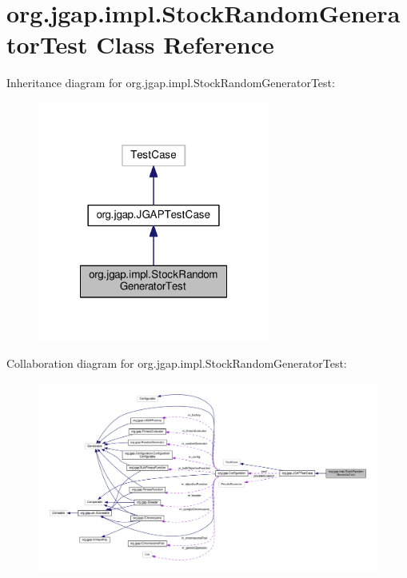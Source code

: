 \hypertarget{classorg_1_1jgap_1_1impl_1_1_stock_random_generator_test}{\section{org.\-jgap.\-impl.\-Stock\-Random\-Generator\-Test Class Reference}
\label{classorg_1_1jgap_1_1impl_1_1_stock_random_generator_test}
}


Inheritance diagram for org.\-jgap.\-impl.\-Stock\-Random\-Generator\-Test\-:
\nopagebreak
\begin{figure}[H]
\begin{center}
\leavevmode
\includegraphics[width=216pt]{classorg_1_1jgap_1_1impl_1_1_stock_random_generator_test__inherit__graph}
\end{center}
\end{figure}


Collaboration diagram for org.\-jgap.\-impl.\-Stock\-Random\-Generator\-Test\-:
\nopagebreak
\begin{figure}[H]
\begin{center}
\leavevmode
\includegraphics[width=350pt]{classorg_1_1jgap_1_1impl_1_1_stock_random_generator_test__coll__graph}
\end{center}
\end{figure}
